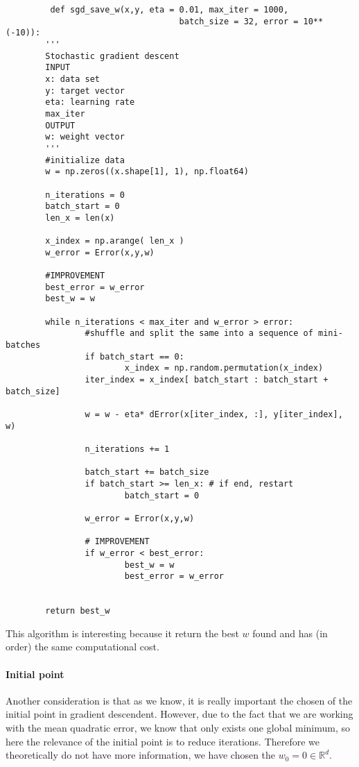        \begin{verbatim}
         def sgd_save_w(x,y, eta = 0.01, max_iter = 1000,
                                   batch_size = 32, error = 10**(-10)):
        '''
        Stochastic gradient descent
        INPUT 
        x: data set
        y: target vector
        eta: learning rate
        max_iter 
        OUTPUT 
        w: weight vector
        '''
        #initialize data
        w = np.zeros((x.shape[1], 1), np.float64)
    
        n_iterations = 0
        batch_start = 0
        len_x = len(x)
    
        x_index = np.arange( len_x )
        w_error = Error(x,y,w)

        #IMPROVEMENT
        best_error = w_error
        best_w = w 
 
        while n_iterations < max_iter and w_error > error:
                #shuffle and split the same into a sequence of mini-batches
                if batch_start == 0:
                        x_index = np.random.permutation(x_index)
                iter_index = x_index[ batch_start : batch_start + batch_size]

                w = w - eta* dError(x[iter_index, :], y[iter_index], w)
                
                n_iterations += 1

                batch_start += batch_size
                if batch_start >= len_x: # if end, restart
                        batch_start = 0
                
                w_error = Error(x,y,w)

                # IMPROVEMENT  
                if w_error < best_error:
                        best_w = w
                        best_error = w_error


        return best_w

      \end{verbatim}

    This algorithm is interesting because it return the best $w$ found and has (in order) the same computational cost. 


    \paragraph{Initial point}

    Another consideration is that as we know, it is really important the chosen of the initial point in gradient descendent. However, due to the fact that we are working with the mean quadratic error, we know that only exists  one global minimum, so here the relevance of the initial point is to reduce iterations. Therefore we theoretically do not have more information,  we have chosen the $w_0 = 0 \in \mathbb R^d.$


